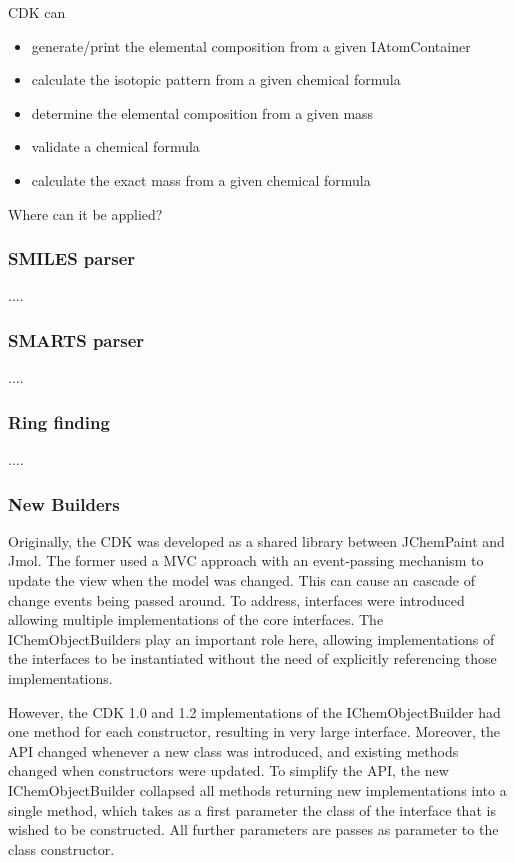 \documentclass[10pt]{bmcart}
\begin{document}
CDK can
\begin{itemize}
\item generate/print the elemental composition from a given IAtomContainer
\item calculate the isotopic pattern from a given chemical formula
\item determine the elemental composition from a given mass
\item validate a chemical formula
\item calculate the exact mass from a given chemical formula
\end{itemize}

Where can it be applied?

  \subsubsection*{SMILES parser}
  
  ....

  \subsubsection*{SMARTS parser}
  
  ....

  \subsubsection*{Ring finding}
  
  .... \cite{May2014}

  \subsubsection*{New Builders}

Originally, the CDK was developed as a shared library between JChemPaint and Jmol. The former
used a MVC approach with an event-passing mechanism to update the view when the model was
changed. This can cause an cascade of change events being passed around. To address,
interfaces were introduced allowing multiple implementations of the core interfaces.
The IChemObjectBuilders play an important role here, allowing implementations of the
interfaces to be instantiated without the need of explicitly referencing those implementations.

However, the CDK 1.0 and 1.2 implementations of the IChemObjectBuilder had one method for
each constructor, resulting in very large interface. Moreover, the API changed whenever
a new class was introduced, and existing methods changed when constructors were updated.
To simplify the API, the new IChemObjectBuilder collapsed all methods returning new
implementations into a single method, which takes as a first parameter the class of the
interface that is wished to be constructed. All further parameters are passes as
parameter to the class constructor.
\end{document}
